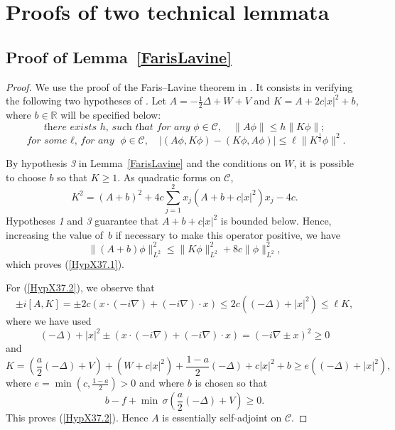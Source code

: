 \documentclass[a4paper,11pt]{article}
\theoremstyle{plain}
\theoremstyle{remark}
\def\R{{\mathbb R}}
\begin{document}
\appendix


\section{Proofs of two technical lemmata}

\subsection{Proof of Lemma~\ref{FarisLavine}}\label{sec:FL_lemma}
\begin{proof}
We use the proof of the Faris--Lavine theorem in \cite{ReedSimon2}. It consists in verifying the following two hypotheses of \cite[Theorem X.37]{ReedSimon2}.  Let $A = -\frac12\Delta + W+V$ and $K=A+2c|x|^2 +b$, where $b\in\R$ will be specified below:
\begin{equation}
\label{HypX37.1}\textit{there exists $h$, such that for any } \phi \in \mathcal{C},
\quad \|A\phi\|\leq h \|K\phi\|;
\end{equation}
\begin{equation}
\label{HypX37.2}
\textit{for some $\ell$, for any }  \phi \in \mathcal{C},\quad |(A\phi,K\phi) - (K\phi,A\phi)| \leq \ell \|K^\frac{1}{2} \phi\|^2.
\end{equation}

By hypothesis \textit{3} in Lemma~\ref{FarisLavine} and the conditions on $W$, it is possible to choose $b$ so that $K\geq 1$.
As quadratic forms on $\mathcal{C}$,
\[K^2 = (A+b)^2 + 4c \sum_{j=1}^2 x_j (A+b+c|x|^2)x_j - 4c.  \]
Hypotheses \textit{1} and \textit{3} guarantee that $A+b+c|x|^2$ is bounded below.
Hence, increasing the value of~$b$ if necessary to make this operator positive, we have
\[ \|(A+b)\phi\|^2_{L^2} \leq \|K\phi \|^2_{L^2} +8c\|\phi \|^2_{L^2},\]
which proves (\ref{HypX37.1}).

\medskip

For (\ref{HypX37.2}), we observe that
\[ \pm i [A,K] = \pm 2c(x \cdot (-i\nabla) + (-i\nabla)\cdot x) \leq 2 c \left((-\Delta) +|x|^2\right) \leq \ell K, \]
where we have used
\[(-\Delta) + |x|^2 \pm (x\cdot(-i\nabla) + (-i\nabla)\cdot x) = (-i\nabla  \pm x)^2 \geq 0 \]
and
\[ K = \left(\frac a 2 (-\Delta) + V\right) + (W+c|x|^2) + \frac{1-a}{2}(-\Delta) + c|x|^2 +b \geq e((-\Delta)+|x|^2), \]
where $e = \min(c,\frac{1-a}{2})>0$ and where $b$ is chosen so that
$$b- f +\min \,\sigma\left(\frac a 2 (-\Delta) + V\right) \geq 0.$$
This proves  (\ref{HypX37.2}).
Hence $A$ is essentially self-adjoint on $\mathcal{C}$.
\end{proof}
\end{document}
